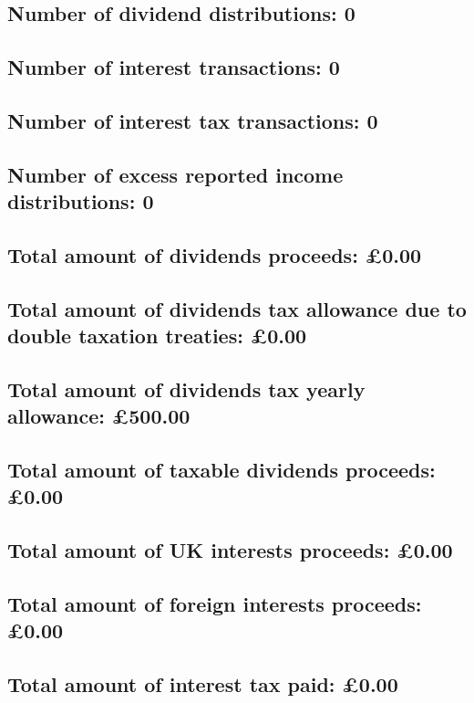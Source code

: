 \documentclass{article}
\begin{document}
\subsection*{Number of dividend distributions: 0}
\subsection*{Number of interest transactions: 0}
\subsection*{Number of interest tax transactions: 0}
\subsection*{Number of excess reported income distributions: 0}
\subsection*{Total amount of dividends proceeds: £0.00}
\subsection*{Total amount of dividends tax allowance due to double taxation treaties: £0.00}
\subsection*{Total amount of dividends tax yearly allowance: £500.00}
\subsection*{Total amount of taxable dividends proceeds: £0.00}
\subsection*{Total amount of UK interests proceeds: £0.00}
\subsection*{Total amount of foreign interests proceeds: £0.00}
\subsection*{Total amount of interest tax paid: £0.00}
\end{document}
